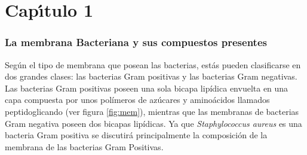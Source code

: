 \chapter{Cap\'{\i}tulo 1}
\subsection{La membrana Bacteriana y sus compuestos presentes}\label{ss:mem}
Seg\'{u}n el tipo de membrana que posean las bacterias, est\'{a}s pueden clasificarse en dos grandes clases: las bacterias Gram positivas y las bacterias Gram negativas. Las bacterias Gram positivas poseen una sola bicapa lip\'{i}dica envuelta en una capa compuesta por unos pol\'{i}meros de az\'{u}cares y amino\'{a}cidos llamados peptidoglicando (ver figura \ref{fig:mem}), mientras que las membranas de bacterias Gram negativa poseen dos bicapas lip\'{i}dicas. Ya que \textit{Staphylococcus aureus} es una bacteria Gram positiva se discutir\'{a} principalmente la composici\'{o}n de la membrana de las bacterias Gram Positivas.\\

